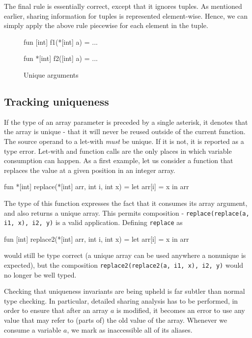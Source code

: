 The final rule is essentially correct, except that it ignores tuples.
As mentioned earlier, sharing information for tuples is represented
element-wise.  Hence, we can simply apply the above rule piecewise for
each element in the tuple.

\begin{figure}
\begin{center}
\begin{bcolorcode}
fun [int] f1(*[int] a) = ...

fun *[int] f2([int] a) = ...
\end{bcolorcode}
\end{center}
\caption{Unique arguments}
\label{fig:unique-arguments}
\end{figure}

\subsection{Tracking uniqueness}
\label{subsec:l0-tracking-uniqueness}

If the type of an array parameter is preceded by a single asterisk, it
denotes that the array is unique - that it will never be reused
outside of the current function.  The source operand to a let-with
\textit{must} be unique.  If it is not, it is reported as a type
error.  Let-with and function calls are the only places in which
variable consumption can happen.  As a first example, let us consider
a function that replaces the value at a given position in an integer
array.

\begin{colorcode}
  fun *[int] replace(*[int] arr, int i, int x) =
    let arr[i] = x in arr
\end{colorcode}

The type of this function expresses the fact that it consumes its
array argument, and also returns a unique array.  This permits
composition - \texttt{replace(replace(a, i1, x), i2, y)} is a valid
application.  Defining \texttt{replace} as
\begin{colorcode}
  fun [int] replace2(*[int] arr, int i, int x) =
    let arr[i] = x in arr
\end{colorcode}
would still be type correct (a unique array can be used anywhere a
nonunique is expected), but the composition
\texttt{replace2(replace2(a, i1, x), i2, y)} would no longer be well
typed.

Checking that uniqueness invariants are being upheld is far subtler
than normal type checking.  In particular, detailed sharing analysis
has to be performed, in order to ensure that after an array $a$ is
modified, it becomes an error to use any value that may refer to
(parts of) the old value of the array.  Whenever we consume a variable
$a$, we mark as inaccessible all of its aliases.

